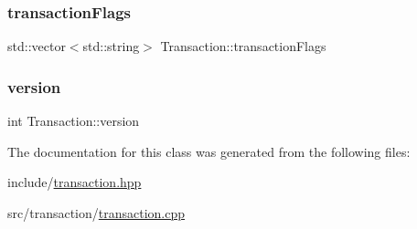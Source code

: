 \subsubsection{\texorpdfstring{transaction\+Flags}{transactionFlags}}
{\footnotesize\ttfamily std\+::vector$<$std\+::string$>$ Transaction\+::transaction\+Flags\hspace{0.3cm}{\ttfamily [private]}}

\mbox{\label{classTransaction_a7d8682b58b273ea2d0d6071355175ea3}} 
\subsubsection{\texorpdfstring{version}{version}}
{\footnotesize\ttfamily int Transaction\+::version\hspace{0.3cm}{\ttfamily [private]}}



The documentation for this class was generated from the following files\+:\begin{DoxyCompactItemize}
\item 
include/\mbox{\hyperlink{transaction_8hpp}{transaction.\+hpp}}\item 
src/transaction/\mbox{\hyperlink{transaction_8cpp}{transaction.\+cpp}}\end{DoxyCompactItemize}
